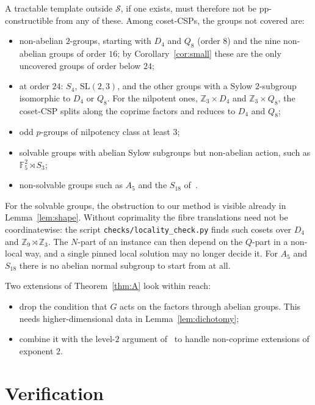 \documentclass[11pt]{article}
\theoremstyle{definition}
\theoremstyle{remark}
\newcommand{\Z}{\mathbb Z}
\begin{document}
A tractable template outside $\mathcal S$, if one exists, must therefore not be
pp-constructible from any of these. Among coset-CSPs, the groups not covered
are:
\begin{itemize}
\item non-abelian $2$-groups, starting with $D_4$ and $Q_8$ (order $8$) and the
nine non-abelian groups of order $16$; by Corollary~\ref{cor:small} these are the
only uncovered groups of order below $24$;
\item at order $24$: $S_4$, $\mathrm{SL}(2,3)$, and the other groups with a
Sylow $2$-subgroup isomorphic to $D_4$ or $Q_8$. For the nilpotent ones,
$\Z_3\times D_4$ and $\Z_3\times Q_8$, the coset-CSP splits along the coprime
factors and reduces to $D_4$ and $Q_8$;
\item odd $p$-groups of nilpotency class at least $3$;
\item solvable groups with abelian Sylow subgroups but non-abelian action, such
as $\mathbb F_5^2\rtimes S_3$;
\item non-solvable groups such as $A_5$ and the $S_{18}$ of~\cite{LP25}.
\end{itemize}
For the solvable groups, the obstruction to our method is visible already in
Lemma~\ref{lem:shape}. Without coprimality the fibre translations need not be
coordinatewise: the script \texttt{checks/locality\_check.py} finds such cosets
over $D_4$ and $\Z_9\rtimes\Z_3$. The $N$-part of an instance can then depend on
the $Q$-part in a non-local way, and a single pinned local solution may no longer
decide it. For $A_5$ and $S_{18}$ there is no abelian normal subgroup to start
from at all.

Two extensions of Theorem~\ref{thm:A} look within reach:
\begin{itemize}
\item drop the condition that $G$ acts on the factors through abelian groups.
This needs higher-dimensional data in Lemma~\ref{lem:dichotomy};
\item combine it with the level-$2$ argument of~\cite{BHZ26} to handle
non-coprime extensions of exponent $2$.
\end{itemize}

\section{Verification}\label{sec:verify}
\end{document}
